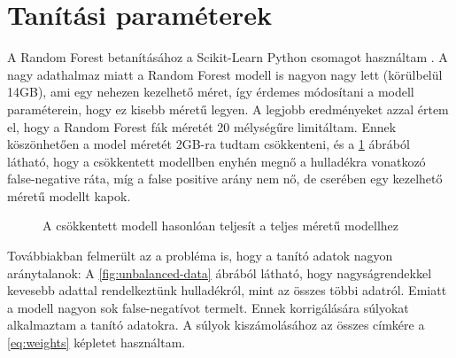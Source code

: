 \section{Tanítási paraméterek}
\label{ch:teaching-params}

A Random Forest betanításához a Scikit-Learn Python csomagot használtam \cite{scikit-learn}. A nagy adathalmaz miatt a Random Forest modell is nagyon nagy lett (körülbelül 14GB), ami egy nehezen kezelhető méret, így érdemes módosítani a modell paraméterein, hogy ez kisebb méretű legyen. A legjobb eredményeket azzal értem el, hogy a Random Forest fák méretét 20 mélységűre limitáltam. Ennek köszönhetően a model méretét 2GB-ra tudtam csökkenteni, és a \ref{fig:fullsize-vs-reduced} ábrából látható, hogy a csökkentett modellben enyhén megnő a hulladékra vonatkozó false-negative ráta, míg a false positive arány nem nő, de cserében egy kezelhető méretű modellt kapok.

\begin{figure}[H]
	\centering
	\hspace{5pt}
	\hspace{5pt}
	\caption{A csökkentett modell hasonlóan teljesít a teljes méretű modellhez}
	\label{fig:fullsize-vs-reduced}
\end{figure}

Továbbiakban felmerült az a probléma is, hogy a tanító adatok nagyon aránytalanok: A \ref{fig:unbalanced-data} ábrából látható, hogy nagyságrendekkel kevesebb adattal rendelkeztünk hulladékról, mint az összes többi adatról. Emiatt a modell nagyon sok false-negatívot termelt. Ennek korrigálására súlyokat alkalmaztam a tanító adatokra. A súlyok kiszámolásához az összes címkére a \ref{eq:weights} képletet használtam.

\datacounts

